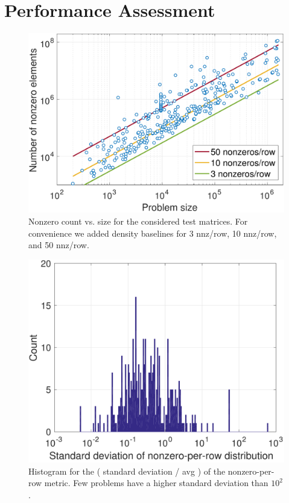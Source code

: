\section{Performance Assessment}
\label{s4-experiments}

\begin{figure}
\begin{center}
\includegraphics[width=\columnwidth]{plots/matrixchar_nnz}
\end{center}
\caption{Nonzero count vs. size for the considered test matrices. 
For convenience we added density baselines for 3 nnz/row, 10 nnz/row, and 50 nnz/row.
}
\label{fig:matrixnnz}
\end{figure}


\begin{figure}
\begin{center}
\includegraphics[width=\columnwidth]{plots/matrixchar_std_avg_logy}
\end{center}
\caption{Histogram for the ( standard deviation / avg ) of the nonzero-per-row metric. Few problems have a higher standard deviation than $10^2$.}
\label{fig:matrixstd}
\end{figure}

